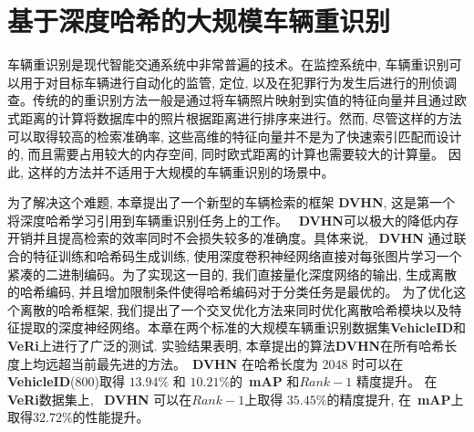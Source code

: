 \chapter{基于深度哈希的大规模车辆重识别}
车辆重识别是现代智能交通系统中非常普遍的技术。在监控系统中, 车辆重识别可以用于对目标车辆进行自动化的监管, 定位, 以及在犯罪行为发生后进行的刑侦调查。传统的的重识别方法一般是通过将车辆照片映射到实值的特征向量并且通过欧式距离的计算将数据库中的照片根据距离进行排序来进行。然而, 尽管这样的方法可以取得较高的检索准确率, 这些高维的特征向量并不是为了快速索引匹配而设计的, 而且需要占用较大的内存空间, 同时欧式距离的计算也需要较大的计算量。 因此, 这样的方法并不适用于大规模的车辆重识别的场景中。 \par
为了解决这个难题, 本章提出了一个新型的车辆检索的框架 \textbf{DVHN}, 这是第一个将深度哈希学习引用到车辆重识别任务上的工作。 ~\textbf{DVHN}可以极大的降低内存开销并且提高检索的效率同时不会损失较多的准确度。具体来说, ~\textbf{DVHN} 通过联合的特征训练和哈希码生成训练, 使用深度卷积神经网络直接对每张图片学习一个紧凑的二进制编码。为了实现这一目的, 我们直接量化深度网络的输出, 生成离散的哈希编码, 并且增加限制条件使得哈希编码对于分类任务是最优的。 为了优化这个离散的哈希框架, 我们提出了一个交叉优化方法来同时优化离散哈希模块以及特征提取的深度神经网络。本章在两个标准的大规模车辆重识别数据集\textbf{VehicleID}和\textbf{VeRi}上进行了广泛的测试. 实验结果表明, 本章提出的算法\textbf{DVHN}在所有哈希长度上均远超当前最先进的方法。~\textbf{DVHN} 在哈希长度为 $2048$ 时可以在\textbf{VehicleID}(800)取得 $13.94 \%$ 和 $10.21 \%$的~\textbf{mAP} 和$Rank-1$ 精度提升。 在 \textbf{VeRi}数据集上, ~\textbf{DVHN} 可以在$Rank-1$上取得 $35.45 \%$的精度提升, 在~\textbf{mAP}上取得$32.72 \%$的性能提升。
